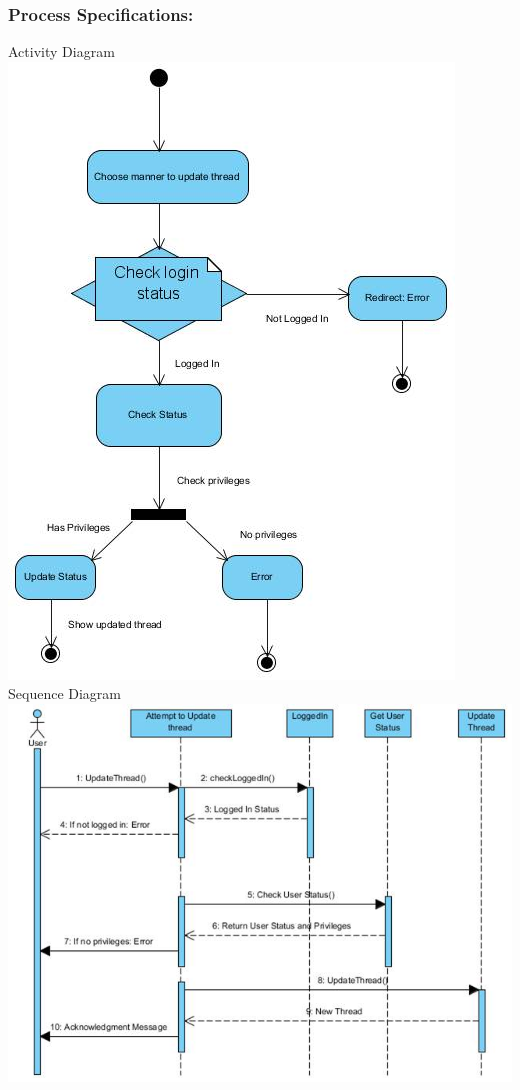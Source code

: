 \documentclass[a4paper,11pt]{article}
\begin{document}
\subsubsection{Process Specifications:} 
Activity Diagram\\
\includegraphics[width=1\linewidth]{./Images/CRUDThread/Diagrams/11.jpg}\\
\newpage
Sequence Diagram\\
\includegraphics[width=1\linewidth]{./Images/CRUDThread/Diagrams/12.jpg}\\
\end{document}
